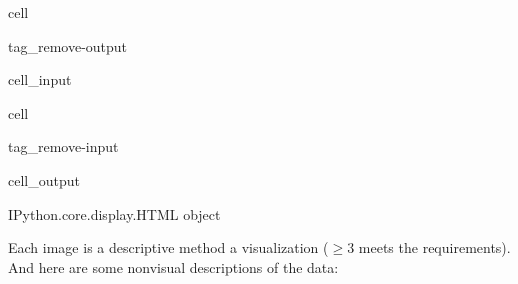 \documentclass[letterpaper,10pt,english]{jupyterBook}
\begin{document}
\begin{sphinxuseclass}{cell}
\begin{sphinxuseclass}{tag_remove-output}\begin{sphinxVerbatimInput}

\begin{sphinxuseclass}{cell_input}
\begin{sphinxVerbatim}[commandchars=\\\{\}]
 
\end{sphinxVerbatim}

\end{sphinxuseclass}\end{sphinxVerbatimInput}

\end{sphinxuseclass}
\end{sphinxuseclass}
\begin{sphinxuseclass}{cell}
\begin{sphinxuseclass}{tag_remove-input}\begin{sphinxVerbatimOutput}

\begin{sphinxuseclass}{cell_output}
\begin{sphinxVerbatim}[commandchars=\\\{\}]
\PYGZlt{}IPython.core.display.HTML object\PYGZgt{}
\end{sphinxVerbatim}

\end{sphinxuseclass}\end{sphinxVerbatimOutput}

\end{sphinxuseclass}
\end{sphinxuseclass}
\sphinxAtStartPar
Each image is a descriptive method  a visualization (\(\geq3\) meets the requirements). And here are some non\sphinxhyphen{}visual descriptions of the data:
\end{document}
